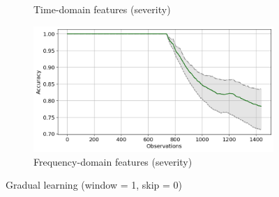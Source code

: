 \begin{figure}[h]
\begin{subfigure}[b]{0.48\textwidth}
        \caption{Time-domain features (severity)}
    \end{subfigure}
    \hfill
    \begin{subfigure}[b]{0.48\textwidth}
        \includegraphics[width=\textwidth]{assets/results/incremental-learning/gradual-TD-severity.png}
        \caption{Frequency-domain features (severity)}
    \end{subfigure} 
    \caption{Gradual learning (window = 1, skip = 0)}
\end{figure}


